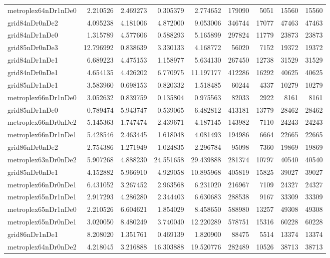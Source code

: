 \begin{longtable}{|l|r|r|r|r|r|r|r|r|}
metroplex64nDr1nDe0 & 2.210526 & 2.469273 & 0.305379 & 2.774652 & 179090 & 5051 & 15560 & 15560 \\
grid84nDr0nDe2 & 4.095238 & 4.181006 & 4.872000 & 9.053006 & 346744 & 17077 & 47463 & 47463 \\
grid84nDr1nDe0 & 1.315789 & 4.577606 & 0.588293 & 5.165899 & 297824 & 11779 & 23873 & 23873 \\
grid85nDr0nDe3 & 12.796992 & 0.838639 & 3.330133 & 4.168772 & 56020 & 7152 & 19372 & 19372 \\
grid84nDr1nDe1 & 6.689223 & 4.475153 & 1.158977 & 5.634130 & 267450 & 12738 & 31529 & 31529 \\
grid84nDr0nDe1 & 4.654135 & 4.426202 & 6.770975 & 11.197177 & 412286 & 16292 & 40625 & 40625 \\
grid85nDr1nDe1 & 3.583960 & 0.698153 & 0.820332 & 1.518485 & 60244 & 4337 & 10279 & 10279 \\
metroplex66nDr1nDe0 & 3.052632 & 0.839759 & 0.135804 & 0.975563 & 82033 & 2922 & 8161 & 8161 \\
grid85nDr1nDe0 & 0.789474 & 5.943747 & 0.539065 & 6.482812 & 413181 & 13779 & 28462 & 28462 \\
metroplex66nDr0nDe2 & 5.145363 & 1.747474 & 2.439671 & 4.187145 & 143982 & 7110 & 24243 & 24243 \\
metroplex66nDr1nDe1 & 5.428546 & 2.463445 & 1.618048 & 4.081493 & 194986 & 6664 & 22665 & 22665 \\
grid86nDr0nDe2 & 2.754386 & 1.271949 & 1.024835 & 2.296784 & 95098 & 7360 & 19869 & 19869 \\
metroplex63nDr0nDe2 & 5.907268 & 4.888230 & 24.551658 & 29.439888 & 281374 & 10797 & 40540 & 40540 \\
grid85nDr0nDe1 & 4.152882 & 5.966910 & 4.929058 & 10.895968 & 405819 & 15825 & 39027 & 39027 \\
metroplex66nDr0nDe1 & 6.431052 & 3.267452 & 2.963568 & 6.231020 & 216967 & 7109 & 24327 & 24327 \\
metroplex65nDr1nDe1 & 2.917293 & 4.286280 & 2.344403 & 6.630683 & 288538 & 9167 & 33309 & 33309 \\
metroplex65nDr1nDe0 & 2.210526 & 6.604621 & 1.854029 & 8.458650 & 588980 & 13257 & 49308 & 49308 \\
metroplex65nDr0nDe1 & 3.020050 & 8.480249 & 3.740040 & 12.220289 & 578751 & 15316 & 60228 & 60228 \\
grid86nDr1nDe1 & 8.208020 & 1.351761 & 0.469139 & 1.820900 & 88475 & 5514 & 13374 & 13374 \\
metroplex64nDr0nDe2 & 4.218045 & 3.216888 & 16.303888 & 19.520776 & 282489 & 10526 & 38713 & 38713 \\

\end{longtable}
